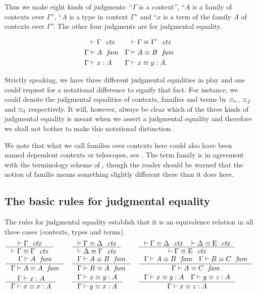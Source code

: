 Thus we make eight kinds of judgments: ``$\Gamma$ is a context'',
``$A$ is a family of contexts over $\Gamma$'', ``$A$ is a type in context $\Gamma$''
and ``$x$ is a term of the family $A$ of contexts over $\Gamma$''. The other four
judgments are for judgmental equality. 

\begin{align*}
\jctx*{\Gamma} 
& \jctxeq*{\Gamma}{\Gamma'}
  \\
\jfam*{\Gamma}{A} 
& \jfameq*{\Gamma}{A}{B}
  \\
\jterm*{\Gamma}{A}{x} 
& \jtermeq*{\Gamma}{A}{x}{y}.
\end{align*}

Strictly speaking, we have three different judgmental equalities in play and one
could request for a notational difference to signify that fact. For instance,
we could denote the judgmental equalities of contexts, families and terms by
$\equiv_c$, $\equiv_f$ and $\equiv_t$ respectively. It will, however, always be
clear which of the three kinds of judgmental equality is meant when we assert
a judgmental equality and therefore we shall not bother to make this notational
distinction.

We note that what we call families over contexts
here could also have been named dependent contexts or telescopes, see
\cite{deBruijn1991,hofmann1995extensional}. The term family is in agreement
with the terminology scheme of \cite{TheBook}, though the reader should be
warned that the notion of familie means something slightly different there than
it does here.

\subsection{The basic rules for judgmental equality}
The rules for judgmental equality establish that it is an equivalence relation
in all three cases (contexts, types and terms).
\bgroup\small
\begin{align*}
& \inference
  { \jctx{\Gamma}
    }
  { \jctxeq{\Gamma}{\Gamma}
    } 
& & \inference
    { \jctxeq{\Gamma}{\Delta}
      }
    { \jctxeq{\Delta}{\Gamma}
      } 
& & \inference
    { \jctxeq{\Gamma}{\Delta}
      \jctxeq{\Delta}{\greek{E}}
      }
    { \jctxeq{\Gamma}{\greek{E}}
      }
    \\
& \inference
  { \jfam{\Gamma}{A}
    }
  { \jfameq{\Gamma}{A}{A}
    } 
& & \inference
    { \jfameq{\Gamma}{A}{B}
      }
    { \jfameq{\Gamma}{B}{A}
      }
& & \inference
    { \jfameq{\Gamma}{A}{B}
      \jfameq{\Gamma}{B}{C}
      }
    { \jfameq{\Gamma}{A}{C}
      }
    \\
& \inference
  { \jterm{\Gamma}{A}{x}
    }
  { \jtermeq{\Gamma}{A}{x}{x}
    }
& & \inference
    { \jtermeq{\Gamma}{A}{x}{y}
      }
    { \jtermeq{\Gamma}{A}{y}{x}
      }
& & \inference
    { \jtermeq{\Gamma}{A}{x}{y}
      \jtermeq{\Gamma}{A}{y}{z}
      }
    { \jtermeq{\Gamma}{A}{x}{z}
      }
\end{align*}
\egroup

